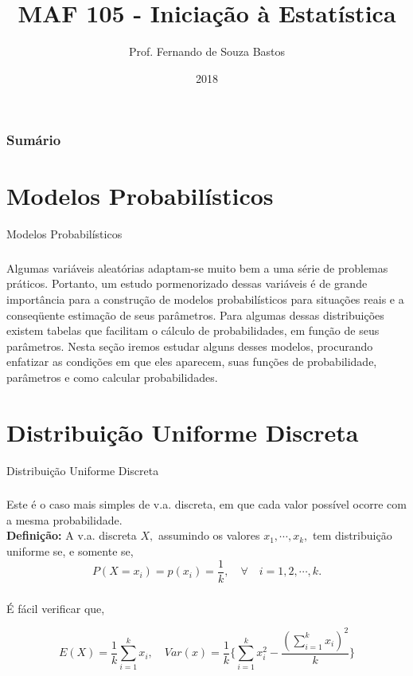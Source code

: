 \documentclass[14pt,aspectratio=1610]{beamer}
\title{MAF 105 - Iniciação à Estatística}
\author{Prof. Fernando de Souza Bastos}
\institute{Instituto de Ciências Exatas e Tecnológicas\texorpdfstring{\\ Universidade Federal de Viçosa}{}\texorpdfstring{\\ Campus UFV - Florestal}{}}
\date{2018}
\begin{document}


\frame{\titlepage}

\begin{frame}{}
\frametitle{\bf Sumário}
\tableofcontents
\end{frame}

\section{Modelos Probabilísticos}
\begin{frame}{Modelos Probabilísticos}
\frametitle{}
\begin{block}{}
\justifying
Algumas variáveis aleatórias adaptam-se muito bem a uma série de problemas
práticos. Portanto, um estudo pormenorizado dessas variáveis é de grande importância
para a construção de modelos probabilísticos para situações reais e a conseqüente
estimação de seus parâmetros. Para algumas dessas distribuições existem tabelas que
facilitam o cálculo de probabilidades, em função de seus parâmetros. Nesta seção
iremos estudar alguns desses modelos, procurando enfatizar as condições em que eles
aparecem, suas funções de probabilidade, parâmetros e como calcular probabilidades.
\end{block}
\end{frame}

\section{Distribuição Uniforme Discreta}
\begin{frame}{Distribuição Uniforme Discreta}
\frametitle{}
\begin{block}{}
\justifying
Este é o caso mais simples de v.a. discreta, em que cada valor possível ocorre com
a mesma probabilidade.\\
{\bf Definição:} A v.a. discreta $X,$ assumindo os valores $x_{1},\cdots, x_{k},$ tem distribuição uniforme se, e somente se,
$$P(X=x_{i})=p(x_{i})=\dfrac{1}{k},\quad \forall\quad i=1,2,\cdots,k.$$
\end{block}
\end{frame}

\begin{frame}{}
\frametitle{}
\begin{block}{}
\justifying
É fácil verificar que,

$$
E(X)=\dfrac{1}{k}{\displaystyle \sum_{i=1}^{k}x_{i}},\quad 
Var(x)=\dfrac{1}{k}\Biggl\{{\displaystyle \sum_{i=1}^{k}x_{i}^{2}}-\dfrac{{\displaystyle\left(\sum_{i=1}^{k}x_{i}\right)^{2}}}{k} \Biggl\}
$$

\end{block}
\end{frame}
\end{document}
